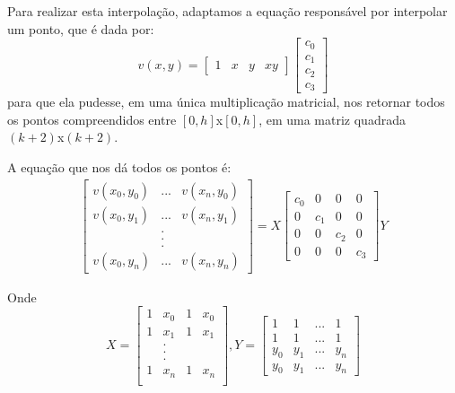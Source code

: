 \documentclass{article}
\begin{document}
	 Para realizar esta interpolação, adaptamos a equação responsável por interpolar um ponto, que é dada por:
	 \[
	 	v(x,y) = 
	 	\left[
	 		\begin{array}{llll}
		 		1 & x & y & xy
	 		\end{array}
	 	\right]
	 	\left[
	 		\begin{array}{llll}
	 		c_{0}\\
	 		c_{1}\\
	 		c_{2}\\
	 		c_{3}
	 		\end{array}
	 	\right]
	 \]
	  para que ela pudesse, em uma única multiplicação matricial, nos retornar todos os pontos compreendidos entre $[0, h]$x$[0, h]$, em uma matriz quadrada $(k+2)$x$(k+2)$. \par
	  A equação que nos dá todos os pontos é:
	  \begin{equation}
	  \begin{aligned}
	  	\left[
	  	\begin{array}{cccc}
	  	
	  		v(x_{0}, y_{0}) & ... & v(x_{n}, y_{0})\\
	  		v(x_{0}, y_{1}) & ... & v(x_{n}, y_{1})\\
	  				       &  .  &    \\
	  				       &  .  &    \\
	  				       &  .  &    \\ 	
	  		v(x_{0}, y_{n}) & ... & v(x_{n}, y_{n})
	  			
	  	\end{array}
	  	\right]
	  	= 
	  	X
	  	\left[
	  		\begin{array}{cccc}
	  			c_{0}     & 0     & 0     & 0\\
	  			0         & c_{1} & 0     & 0\\
	  			0         &  0    & c_{2} & 0\\
	  			0         &  0    &   0   & c_{3} 
	  		\end{array}
	  	\right]
	  	Y
	  	\end{aligned}
	  \end{equation}\par 
	  Onde 
	  \[
	  	X = 
	  	\left[
  		\begin{array}{cccc}
  			1 & x_{0} & 1 & x_{0}\\
  			1 & x_{1} & 1 & x_{1}\\
				&.\\
				&.\\
				&.\\
  			1 & x_{n} & 1 & x_{n}\\
  		\end{array}
  	\right]
  	,Y =
	  	\left[
	  		\begin{array}{cccc}
	  			1     & 1     & ...     & 1\\
	  			1     & 1     & ...     & 1\\
	  			y_{0} & y_{1} & ...     & y_{n}\\
	  			y_{0} & y_{1} & ...     & y_{n}
	  		\end{array}
	  	\right]
	  \]
\end{document}

